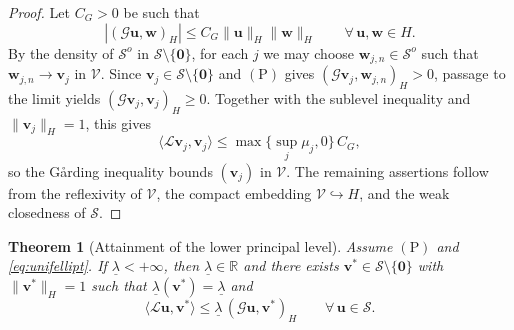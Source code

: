 \documentclass[preprint,10pt]{elsarticle}
\theoremstyle{plain}
\newtheorem{theorem}{Theorem}
\theoremstyle{definition}
\theoremstyle{remark}
\begin{document}
\begin{proof}
	Let $C_G>0$ be such that
	\[
	|(\mathcal G\mathbf u,\mathbf w)_H|
	\le C_G\|\mathbf u\|_H\|\mathbf w\|_H
	\qquad \forall\,\mathbf u,\mathbf w\in H.
	\]
	By the density of $\mathcal{S}^o$ in $\mathcal{S}\setminus\{\mathbf{0}\}$,
	for each $j$ we may choose $\mathbf w_{j,n}\in\mathcal S^o$ such that
	$\mathbf w_{j,n}\to\mathbf v_j$ in $\mathcal V$. Since
	$\mathbf v_j\in\mathcal S\setminus\{\mathbf0\}$ and $\mathrm{(P)}$ gives
	$(\mathcal G\mathbf v_j,\mathbf w_{j,n})_H>0$, passage to the limit yields
	$(\mathcal G\mathbf v_j,\mathbf v_j)_H\ge0$. Together with the sublevel
	inequality and $\|\mathbf{v}_j\|_H=1$, this gives
	\[
	\langle\mathcal{L}\mathbf{v}_j,\mathbf{v}_j\rangle
	\le \max\bigl\{\sup_j\mu_j,0\bigr\}\,C_G,
	\]
	so the G{\aa}rding inequality bounds $(\mathbf{v}_j)$ in $\mathcal{V}$.
	The remaining assertions follow from the reflexivity of $\mathcal{V}$, the
	compact embedding $\mathcal{V}\hookrightarrow H$, and the weak closedness of
	$\mathcal{S}$.
\end{proof}

\begin{theorem}[Attainment of the lower principal level]
	\label{thm:general-left-attainment}
	Assume $\mathrm{(P)}$ and \eqref{eq:unifellipt}. If $\underline\lambda<+\infty$,
	then $\underline\lambda\in\mathbb{R}$ and there exists
	$\mathbf{v}^*\in\mathcal{S}\setminus\{\mathbf{0}\}$ with $\|\mathbf{v}^*\|_H=1$
	such that $\underline\lambda(\mathbf{v}^*)=\underline\lambda$ and
	\begin{equation}\label{eq:continuous-left-quasi}
		\langle\mathcal{L}\mathbf{u},\mathbf{v}^*\rangle
		\le \underline\lambda\,(\mathcal{G}\mathbf{u},\mathbf{v}^*)_H
		\qquad \forall\,\mathbf{u}\in\mathcal{S}.
	\end{equation}
\end{theorem}
\end{document}
